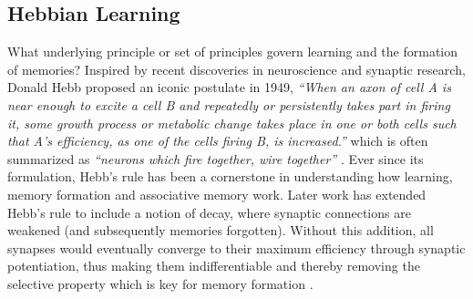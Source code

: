 \subsection{Hebbian Learning}

What underlying principle or set of principles govern learning and the formation of memories? Inspired by recent discoveries in neuroscience and synaptic research, Donald Hebb proposed an iconic postulate in 1949, \textit{``When an axon of cell A is near enough to excite a cell B and repeatedly or persistently takes part in firing it, some growth process or metabolic change takes place in one or both cells such that A's efficiency, as one of the cells firing B, is increased.''} which is often summarized as \textit{``neurons which fire together, wire together''} \cite{hebbs_rule}. Ever since its formulation, Hebb's rule has been a cornerstone in understanding how learning, memory formation and associative memory work. Later work has extended Hebb's rule to include a notion of decay, where synaptic connections are weakened (and subsequently memories forgotten). Without this addition, all synapses would eventually converge to their maximum efficiency through synaptic potentiation, thus making them indifferentiable and thereby removing the selective property which is key for memory formation \cite{anti_hebbian}.

